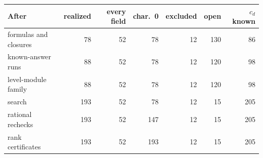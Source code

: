 \begin{tabular}{@{}lrrrrrr@{}}
\toprule
After & realized & every field & char.\ 0 & excluded & open & $c_d$ known\\
\midrule
formulas and closures & 78 & 52 & 78 & 12 & 130 & 86\\
known-answer runs & 88 & 52 & 78 & 12 & 120 & 98\\
level-module family & 88 & 52 & 78 & 12 & 120 & 98\\
search & 193 & 52 & 78 & 12 & 15 & 205\\
rational rechecks & 193 & 52 & 147 & 12 & 15 & 205\\
rank certificates & 193 & 52 & 193 & 12 & 15 & 205\\
\bottomrule
\end{tabular}
